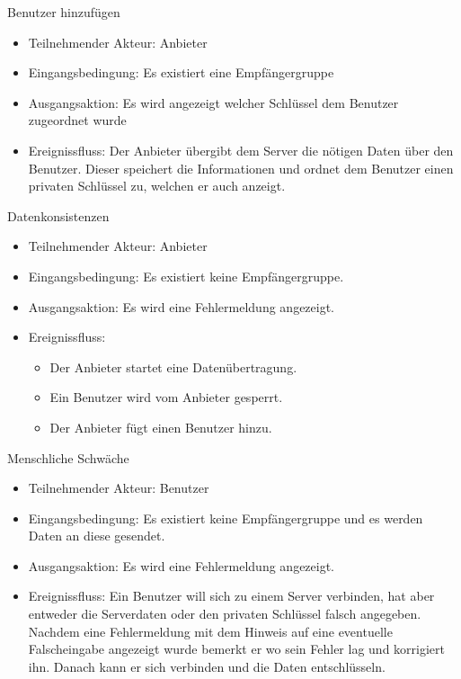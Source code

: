 \documentclass[a4paper,10pt]{scrartcl}
\begin{document}
\begin{usecase}

 {Benutzer hinzufügen
   \begin{itemize}
   \item Teilnehmender Akteur: Anbieter
   \item Eingangsbedingung: Es existiert eine Empfängergruppe
   \item Ausgangsaktion: Es wird angezeigt welcher Schlüssel dem Benutzer zugeordnet wurde
   \item Ereignissfluss: Der Anbieter übergibt dem Server die nötigen Daten über den Benutzer.
         Dieser speichert die Informationen und ordnet dem Benutzer einen privaten Schlüssel
         zu, welchen er auch anzeigt.
   \end{itemize}
}
 {Datenkonsistenzen
   \begin{itemize}
   \item Teilnehmender Akteur: Anbieter
   \item Eingangsbedingung: Es existiert keine Empfängergruppe.
   \item Ausgangsaktion: Es wird eine Fehlermeldung angezeigt.
   \item Ereignissfluss: 
          \begin{itemize}
           \item Der Anbieter startet eine Datenübertragung.
           \item Ein Benutzer wird vom Anbieter gesperrt.
           \item Der Anbieter fügt einen Benutzer hinzu.
           \end{itemize}
   \end{itemize}
}
 {Menschliche Schwäche
   \begin{itemize}
   \item Teilnehmender Akteur: Benutzer
   \item Eingangsbedingung: Es existiert keine Empfängergruppe und es werden Daten an diese gesendet.
   \item Ausgangsaktion: Es wird eine Fehlermeldung angezeigt.
   \item Ereignissfluss: Ein Benutzer will sich zu einem Server verbinden, hat aber entweder die Serverdaten oder den privaten Schlüssel falsch angegeben.
             Nachdem eine Fehlermeldung mit dem Hinweis auf eine eventuelle Falscheingabe angezeigt wurde bemerkt er wo sein Fehler lag und korrigiert ihn.
            Danach kann er sich verbinden und die Daten entschlüsseln.
   \end{itemize}
}
\end{usecase}
\end{document}
